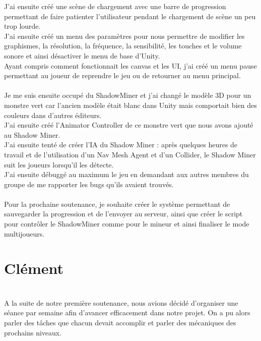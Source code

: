 \documentclass[titlepage, 13px, a4paper]{report}
\begin{document}
J’ai ensuite créé une scène de chargement avec une barre de progression permettant de faire patienter 
l’utilisateur pendant le chargement de scène un peu trop lourde. \\
J’ai ensuite créé un menu des paramètres pour nous permettre de modifier les graphismes, la résolution, 
la fréquence, la sensibilité, les touches et le volume sonore et ainsi désactiver le menu de base d'Unity. \\
Ayant compris comment fonctionnait les canvas et les UI, j’ai créé un menu pause permettant au joueur 
de reprendre le jeu ou de retourner au menu principal. \\ \\


Je me suis ensuite occupé du ShadowMiner et j'ai changé le modèle 3D pour un monstre vert car l’ancien modèle 
était blanc dans Unity mais comportait bien des couleurs dans d’autres éditeurs. \\
J’ai ensuite créé l’Animator Controller de ce monstre vert que nous avons ajouté au Shadow Miner. \\
J’ai ensuite tenté de créer l’IA du Shadow Miner : après quelques heures de travail et de l’utilisation d’un Nav Mesh Agent 
et d’un Collider, le Shadow Miner suit les joueurs lorsqu’il les détecte. \\
J’ai ensuite débuggé au maximum le jeu en demandant aux autres membres du groupe de me rapporter les bugs qu’ils avaient trouvés. \\ \\

Pour la prochaine soutenance, je souhaite créer le système permettant de sauvegarder la progression et de l’envoyer au 
serveur, ainsi que créer le script pour contrôler le ShadowMiner comme pour le mineur et ainsi finaliser le mode multijoueurs. \\



\newpage




\section{Clément}
\paragraph{} \hspace{0pt} \\
A la suite de notre première soutenance, nous avions décidé d'organiser une séance par semaine afin d'avancer efficacement dans notre projet.
On a pu alors parler des tâches que chacun devait accomplir et parler des mécaniques des prochains niveaux. \\ \\
\end{document}
